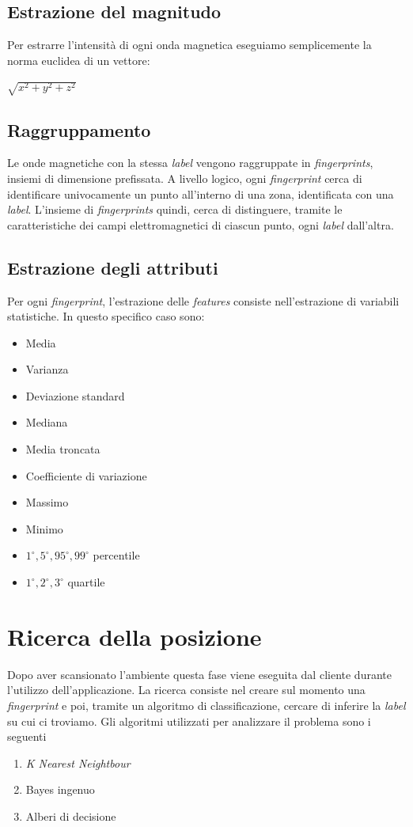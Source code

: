 \subsection*{Estrazione del magnitudo}
Per estrarre l'intensit\`{a} di ogni onda magnetica eseguiamo semplicemente la norma euclidea di un vettore:\\
\begin{center}
	$ \sqrt{x^2 + y^2 + z^2}$
\end{center}

\subsection*{Raggruppamento}
Le onde magnetiche con la stessa \textit{label} vengono raggruppate in \textit{fingerprints}, insiemi di dimensione prefissata. A livello logico, ogni \textit{fingerprint} cerca di identificare univocamente un punto all'interno di una zona, identificata con una \textit{label}. L'insieme di \textit{fingerprints} quindi, cerca di distinguere, tramite le caratteristiche dei campi elettromagnetici di ciascun punto, ogni \textit{label} dall'altra.

\subsection*{Estrazione degli attributi}
Per ogni \textit{fingerprint}, l'estrazione delle \textit{features} consiste nell'estrazione di variabili statistiche. In questo specifico caso sono:
\begin{itemize}
	\item Media
	\item Varianza
	\item Deviazione standard
	\item Mediana
	\item Media troncata
	\item Coefficiente di variazione
	\item Massimo
	\item Minimo
	\item $ 1^{\circ}, 5^{\circ}, 95^{\circ}, 99^{\circ} $ percentile
	\item $ 1^{\circ}, 2^{\circ}, 3^{\circ} $ quartile
\end{itemize}



\section*{Ricerca della posizione}
Dopo aver scansionato l'ambiente questa fase viene eseguita dal cliente durante l'utilizzo dell'applicazione. La ricerca consiste nel creare sul momento una \textit{fingerprint} e poi, tramite un algoritmo di classificazione, cercare di inferire la \textit{label}  su cui ci troviamo. Gli algoritmi utilizzati per analizzare il problema sono i seguenti
\begin{enumerate}
	\item \textit{K Nearest Neightbour}
	\item Bayes ingenuo
	\item  Alberi di decisione
\end{enumerate}
\newpage

